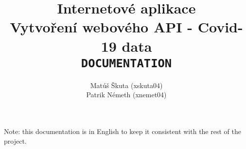 \documentclass[pdftex, 11pt, a4paper]{article}
\newcommand{\code}{\texttt}
\begin{document}
    \title{Internetové aplikace \\
        Vytvoření webového API - Covid-19 data \\\vspace{0.5cm}
        \code{DOCUMENTATION}}
    \author{Matúš Škuta (xskuta04) \\ Patrik Németh (xnemet04)}
    \maketitle

    \begin{center}
        Note: this documentation is in English to keep it consistent with the rest of
        the project.
    \end{center}
\end{document}
